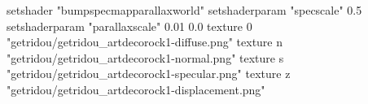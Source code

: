 setshader "bumpspecmapparallaxworld"
setshaderparam "specscale" 0.5
setshaderparam "parallaxscale" 0.01 0.0
texture 0 "getridou/getridou_artdecorock1-diffuse.png"
texture n "getridou/getridou_artdecorock1-normal.png"
texture s "getridou/getridou_artdecorock1-specular.png"
texture z "getridou/getridou_artdecorock1-displacement.png"